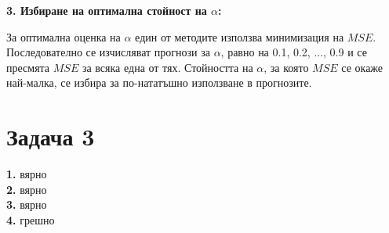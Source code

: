 \documentclass{article}
\begin{document}
\begin{flushleft}
\textbf{3. Избиране на оптимална стойност на $\alpha$:}
\begin{flushleft}
За оптимална оценка на $\alpha$ един от методите използва минимизация на $MSE$. Последователно се изчисляват прогнози за $\alpha$, равно на 0.1, 0.2, ..., 0.9 и се пресмята $MSE$ за всяка една от тях. Стойността на $\alpha$, за която $MSE$ се окаже най-малка, се избира за по-нататъшно използване в прогнозите.
\end{flushleft}

\end{flushleft}

\section*{Задача 3}
\begin{flushleft}

\textbf{1.} вярно \\
\textbf{2.} вярно \\
\textbf{3.} вярно \\
\textbf{4.} грешно

\end{flushleft}
\end{document}
